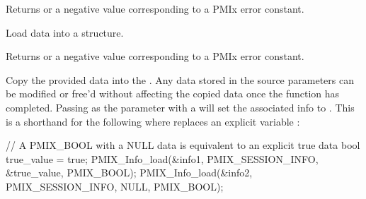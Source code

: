 \format


\begin{arglist}
\end{arglist}

Returns  or a negative value corresponding to a PMIx error constant.


\summary

Load data into a  structure.

\format


\begin{arglist}
\end{arglist}

Returns  or a negative value corresponding to a PMIx error constant.

\descr

Copy the provided data into the . Any data stored in the source parameters can be modified or free'd without affecting the copied data once the function has completed. Passing  as the  parameter with a   will set the associated info to . This is a shorthand for the following where  replaces an explicit variable :
\begin{codepar}
  // A PMIX_BOOL with a NULL data is equivalent to an explicit true data
  bool true_value = true;
  PMIX_Info_load(&info1, PMIX_SESSION_INFO, &true_value, PMIX_BOOL);
  PMIX_Info_load(&info2, PMIX_SESSION_INFO, NULL, PMIX_BOOL);
\end{codepar}

